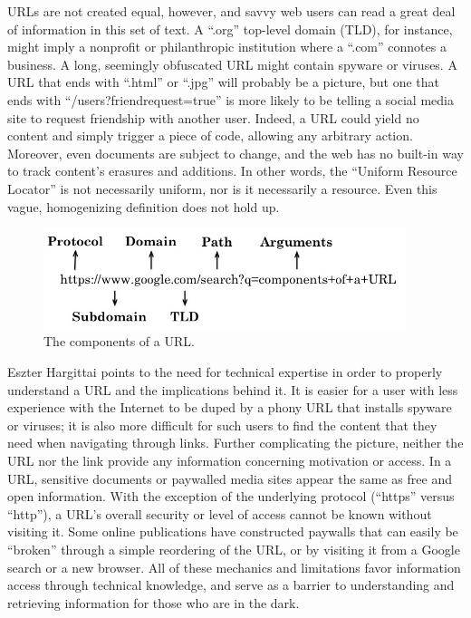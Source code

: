 URLs are not created equal, however, and savvy web users can read a great deal of information in this set of text. A ``.org'' top-level domain (TLD), for instance, might imply a nonprofit or philanthropic institution where a ``.com'' connotes a business. A long, seemingly obfuscated URL might contain spyware or viruses. A URL that ends with ``.html'' or ``.jpg'' will probably be a picture, but one that ends with ``/users?friendrequest=true'' is more likely to be telling a social media site to request friendship with another user. Indeed, a URL could yield no content and simply trigger a piece of code, allowing any arbitrary action. Moreover, even documents are subject to change, and the web has no built-in way to track content's erasures and additions. In other words, the ``Uniform Resource Locator'' is not necessarily uniform, nor is it necessarily a resource. Even this vague, homogenizing definition does not hold up.

\begin{figure}[ht]
\centering
\includegraphics[width=300pt]{figures/annotatedurl}
\caption{The components of a URL.}
\label{fig:annotatedurl}
\end{figure}

Eszter Hargittai points to the need for technical expertise in order to properly understand a URL and the implications behind it.\autocite{hargittai_role_2008} It is easier for a user with less experience with the Internet to be duped by a phony URL that installs spyware or viruses; it is also more difficult for such users to find the content that they need when navigating through links. Further complicating the picture, neither the URL nor the link provide any information concerning motivation or access. In a URL, sensitive documents or paywalled media sites appear the same as free and open information. With the exception of the underlying protocol (``https'' versus ``http''), a URL's overall security or level of access cannot be known without visiting it. Some online publications have constructed paywalls that can easily be ``broken'' through a simple reordering of the URL, or by visiting it from a Google search or a new browser.\autocites[See, e.g.,][]{benton_that_2011}{smith_iv_heres_2015} All of these mechanics and limitations favor information access through technical knowledge, and serve as a barrier to understanding and retrieving information for those who are in the dark.

